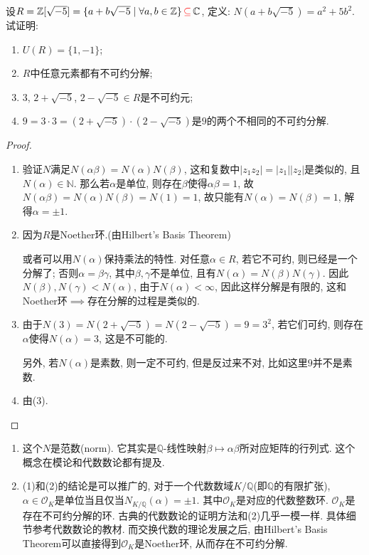 \begin{problem}
    设$R = \mathbb{Z}[\sqrt{-5}] = \{a + b\sqrt{-5} \mid \forall a, b \in \mathbb{Z}\} \,\textcolor{red}{\subseteq}\, \mathbb{C}$, 定义: $N(a + b\sqrt{-5}) = a^2 + 5b^2$. 试证明:
    \begin{enumerate}[(1)]
        \item $U(R) = \{1, -1\}$;
        \item $R$中任意元素都有不可约分解;
        \item $3$, $2 + \sqrt{-5}$, $2 - \sqrt{-5} \in R$是不可约元;
        \item $9 = 3 \cdot 3= (2 + \sqrt{-5}) \cdot (2 - \sqrt{-5})$是$9$的两个不相同的不可约分解.
    \end{enumerate}
\end{problem}

\begin{proof}
    \begin{enumerate}[(1)]
        \item 验证$N$满足$N(\alpha\beta) = N(\alpha)N(\beta)$, 这和复数中$|z_1z_2| = |z_1||z_2|$是类似的, 且$N(\alpha) \in \mathbb{N}$. 那么若$\alpha$是单位, 则存在$\beta$使得$\alpha\beta = 1$, 故$N(\alpha\beta) = N(\alpha)N(\beta) = N(1) = 1$, 故只能有$N(\alpha) = N(\beta) = 1$, 解得$\alpha = \pm 1$.
        \item 因为$R$是Noether环.(由Hilbert's Basis Theorem)
        
        或者可以用$N(\alpha)$保持乘法的特性. 对任意$\alpha \in R$, 若它不可约, 则已经是一个分解了; 否则$\alpha = \beta\gamma$, 其中$\beta, \gamma$不是单位, 且有$N(\alpha) = N(\beta)N(\gamma)$. 因此$N(\beta), N(\gamma) < N(\alpha)$, 由于$N(\alpha) < \infty$, 因此这样分解是有限的, 这和Noether环$\implies$存在分解的过程是类似的.
        \item 由于$N(3) = N(2 + \sqrt{-5}) = N(2 - \sqrt{-5}) = 9 = 3^2$, 若它们可约, 则存在$\alpha$使得$N(\alpha) = 3$, 这是不可能的.
    
        另外, 若$N(\alpha)$是素数, 则一定不可约, 但是反过来不对, 比如这里$9$并不是素数.
        \item 由(3).
    \end{enumerate}
\end{proof}

\begin{remark}
    \begin{enumerate}[1.]
        \item 这个$N$是范数(norm). 它其实是$\mathbb{Q}$-线性映射$\beta \mapsto \alpha\beta$所对应矩阵的行列式. 这个概念在模论和代数数论都有提及.
        \item (1)和(2)的结论是可以推广的, 对于一个代数数域$K/\mathbb{Q}$(即$\mathbb{Q}$的有限扩张), $\alpha \in \mathcal{O}_K$是单位当且仅当$N_{K/\mathbb{Q}}(\alpha) = \pm1$. 其中$\mathcal{O}_K$是对应的代数整数环. $\mathcal{O}_K$是存在不可约分解的环. 古典的代数数论的证明方法和(2)几乎一模一样. 具体细节参考代数数论的教材. 而交换代数的理论发展之后, 由Hilbert's Basis Theorem可以直接得到$\mathcal{O}_K$是Noether环, 从而存在不可约分解.
    \end{enumerate}
\end{remark}

